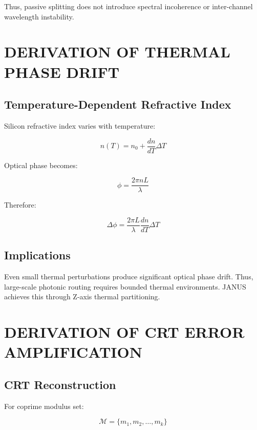 \documentclass[journal]{IEEEtran}
\begin{document}
Thus, passive splitting does not introduce spectral incoherence or inter-channel wavelength instability.

\section{DERIVATION OF THERMAL PHASE DRIFT}

\subsection{\textbf{Temperature-Dependent Refractive Index}}

Silicon refractive index varies with temperature:

\begin{equation}
n(T) = n_0 + \frac{dn}{dT} \Delta T 
\end{equation}

Optical phase becomes:

\begin{equation}
\phi = \frac{2\pi nL}{\lambda}
\end{equation}

Therefore:

\begin{equation}
\Delta \phi = \frac{2\pi L}{\lambda} \frac{dn}{dT} \Delta T
\end{equation}

\subsection{\textbf{Implications}}

Even small thermal perturbations produce significant optical phase drift. Thus, large-scale photonic routing requires bounded thermal environments. JANUS achieves this through Z-axis thermal partitioning.

\section{DERIVATION OF CRT ERROR AMPLIFICATION}

\subsection{\textbf{CRT Reconstruction}}

For coprime modulus set:

\begin{equation}
\mathcal{M} = \{m_1, m_2, \dots, m_k\}
\end{equation}
\end{document}
